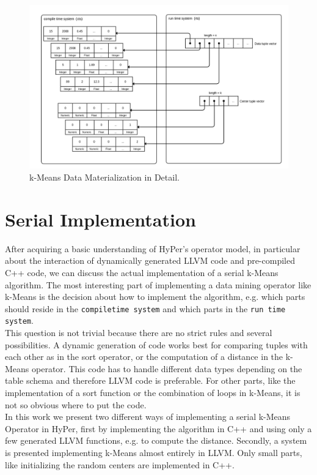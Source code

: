 \begin{figure}[htsb]
  \centering
  \includegraphics[scale=0.25]{figures/mat3}
  \caption[k-Means Data Materialization in Detail]{k-Means Data Materialization in Detail.}
  \label{fig:mat3}
\end{figure}




\section{Serial Implementation}

After acquiring a basic understanding of HyPer’s operator model, in particular about the interaction of dynamically generated LLVM code and pre-compiled C++ code, we can discuss the actual implementation of a serial k-Means algorithm. The most interesting part of implementing a data mining operator like k-Means is the decision about how to implement the algorithm, e.g. which parts should reside in the \texttt{compiletime system} and which parts in the \texttt{run time system}. 
\\
This question is not trivial because there are no strict rules and several possibilities. A dynamic generation of code works best for comparing tuples with each other as in the sort operator, or the computation of a distance in the k-Means operator. This code has to handle different data types depending on the table schema and therefore LLVM code is preferable. For other parts, like the implementation of a sort function or the combination of loops in k-Means, it is not so obvious where to put the code.
\\
In this work we present two different ways of implementing a serial k-Means Operator in HyPer, first by implementing the algorithm in C++ and using only a few generated LLVM functions, e.g. to compute the distance. Secondly, a system is presented implementing k-Means almost entirely in LLVM. Only small parts, like initializing the random centers are implemented in C++.



